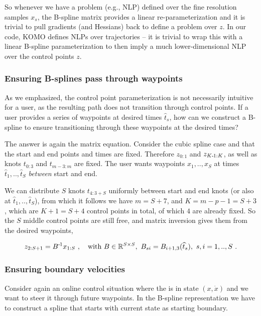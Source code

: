 So whenever we have a problem (e.g., NLP) defined over the fine resolution samples $x_s$, the B-spline matrix provides a linear re-parameterization and it is trivial to pull gradients (and Hessians) back to define a problem over $z$. In our code, KOMO defines NLPs over trajectories -- it is trivial to wrap this with a linear B-spline parameterization to then imply a much lower-dimensional NLP over the control points $z$.

\subsubsection{Ensuring B-splines pass through waypoints}

As we emphasized, the control point parameterization is not necessarily intuitive for a user, as the resulting path does not transition through control points. If a user provides a series of waypoints at desired times $\hat t_s$, how can we construct a B-spline to ensure transitioning through these waypoints at the desired times?

The answer is again the matrix equation. Consider the cubic spline case and that the start and end points and times are fixed. Therefore $z_{0:1}$ and $z_{K{{\hspace*{-.0pt}\text{\rm -}\hspace*{-.5pt}}1}:K}$, as well as knots $t_{0:3}$ and $t_{m-3:m}$ are fixed. The user wants waypoints $x_1,..,x_S$ at times $\hat t_1,..,\hat t_S$ \emph{between} start and end.

We can distribute $S$ knots $t_{4:3+S}$ uniformly between start and end knots (or also at $\hat t_1,..,\hat t_S$), from which it follows we have $m = S+7$, and $K=m-p-1=S+3$, which are $K+1=S+4$ control points in total, of which $4$ are already fixed. So the $S$ middle control points are still free, and matrix inversion gives them from the desired waypoints,

\begin{align}
  z_{2:S+1} = B^{{\hspace*{-.0pt}\text{\rm -}\hspace*{-.5pt}}1} x_{1:S} ~,\quad \text{with } B \in {\mathbb{R}}^{S \times S},~ B_{si} =  B_{i+1,3}(\widehat t_s),~ s,i=1,..,S  ~.
\end{align}



\subsubsection{Ensuring boundary velocities}

Consider again an online control situation where the is in state $(x,\dot x)$ and we want to steer it through future waypoints. In the B-spline representation we have to construct a spline that starts with current state as starting boundary.

